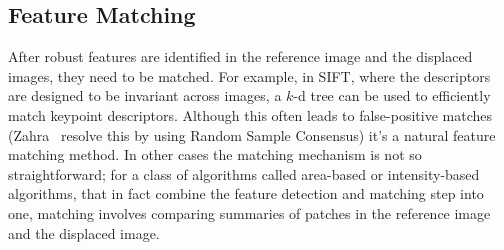 \subsection{Feature Matching}

After robust features are identified in the reference image and the displaced images, they need to be matched.
%
For example, in SIFT, where the descriptors are designed to be invariant across images, a \(k\)-d tree can be used to efficiently match keypoint descriptors.
%
Although this often leads to false-positive matches (Zahra \etal~resolve this by using Random Sample Consensus) it's a natural feature matching method.
%
In other cases the matching mechanism is not so straightforward; for a class of algorithms called area-based or intensity-based algorithms, that in fact combine the feature detection and matching step into one, matching involves comparing summaries of patches in the reference image and the displaced image.

